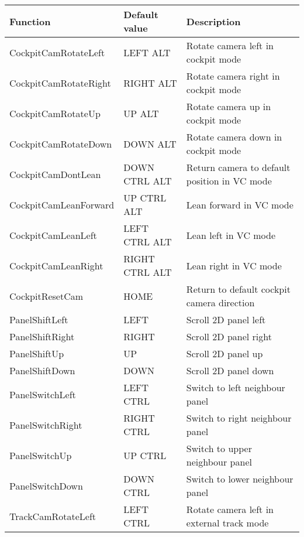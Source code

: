 \documentclass[Orbiter Developer Manual.tex]{subfiles}
\begin{document}
	\begin{longtable}{ |p{}|p{}|p{}| }
	\hline\rule{0pt}{2ex}
	\textbf{Function} & \textbf{Default value} & \textbf{Description}\\
	\hline\rule{0pt}{2ex}
	CockpitCamRotateLeft & LEFT ALT & Rotate camera left in cockpit mode\\
	\hline\rule{0pt}{2ex}
	CockpitCamRotateRight & RIGHT ALT & Rotate camera right in cockpit mode\\
	\hline\rule{0pt}{2ex}
	CockpitCamRotateUp & UP ALT & Rotate camera up in cockpit mode\\
	\hline\rule{0pt}{2ex}
	CockpitCamRotateDown & DOWN ALT & Rotate camera down in cockpit mode\\
	\hline\rule{0pt}{2ex}
	CockpitCamDontLean & DOWN CTRL ALT & Return camera to default position in VC mode\\
	\hline\rule{0pt}{2ex}
	CockpitCamLeanForward & UP CTRL ALT & Lean forward in VC mode\\
	\hline\rule{0pt}{2ex}
	CockpitCamLeanLeft & LEFT CTRL ALT & Lean left in VC mode\\
	\hline\rule{0pt}{2ex}
	CockpitCamLeanRight & RIGHT CTRL ALT & Lean right in VC mode\\
	\hline\rule{0pt}{2ex}
	CockpitResetCam & HOME & Return to default cockpit camera direction\\
	\hline\rule{0pt}{2ex}
	PanelShiftLeft & LEFT & Scroll 2D panel left\\
	\hline\rule{0pt}{2ex}
	PanelShiftRight & RIGHT & Scroll 2D panel right\\
	\hline\rule{0pt}{2ex}
	PanelShiftUp & UP & Scroll 2D panel up\\
	\hline\rule{0pt}{2ex}
	PanelShiftDown & DOWN & Scroll 2D panel down\\
	\hline\rule{0pt}{2ex}
	PanelSwitchLeft & LEFT CTRL & Switch to left neighbour panel\\
	\hline\rule{0pt}{2ex}
	PanelSwitchRight & RIGHT CTRL & Switch to right neighbour panel\\
	\hline\rule{0pt}{2ex}
	PanelSwitchUp & UP CTRL & Switch to upper neighbour panel\\
	\hline\rule{0pt}{2ex}
	PanelSwitchDown & DOWN CTRL & Switch to lower neighbour panel\\
	\hline\rule{0pt}{2ex}
	TrackCamRotateLeft & LEFT CTRL & Rotate camera left in external track mode\\

\end{longtable}
\end{document}

